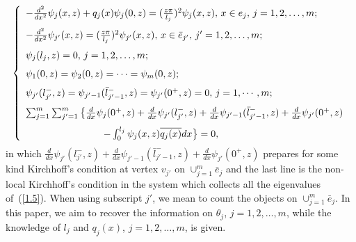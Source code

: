 \documentclass[10pt,a4paper]{article}
\theoremstyle{plain}
\theoremstyle{definition}
\theoremstyle{remark}
\numberwithin{equation}{section}
\begin{document}
\begin{eqnarray}\label{1.5}
\left\{
  \begin{array}{llllll}\vspace{7pt}
-\frac{d^{2}}{dx^{2}}\psi_{j}(x,z)+q_{j}(x)\psi_{j}(0,z)=(\frac{z\pi}{l_{j}})^{2}\psi_{j}(x,z),\,x\in e_{j},\,j=1,2,\ldots,m;\\\vspace{7pt}
-\frac{d^{2}}{dx^{2}}\psi_{j'}(x,z)=(\frac{z\pi}{l_{j}})^{2}\psi_{j'}(x,z),\,x\in \bar{e}_{j'},\,j'=1,2,\ldots,m;\\\vspace{7pt}
\psi_{j}(l_{j},z)=0,\,j=1,2,\ldots,m;\\\vspace{7pt}
\psi_{1}(0,z)=\psi_{2}(0,z)=\cdots=\psi_{m}(0,z);\\\vspace{7pt}
\psi_{j'}(l_{j'}^{-},z)=\psi_{j'-1}(\bar{l}_{j'-1}^{-},z)=\psi_{j'}(0^{+},z)=0,\,j=1,\cdots,m;\\\vspace{7pt}
\sum_{j=1}^{m}\sum_{j'=1}^{m}\big\{\frac{d}{dx}\psi_{j}(0^{+},z)+\frac{d}{dx}\psi_{j'}(l_{j'}^{-},z)+\frac{d}{dx}\psi_{j'-1}(\bar{l}_{j'-1}^{-},z)+\frac{d}{dx}\psi_{j'}(0^{+},z)\\\hspace{80pt}-\int_{0}^{l_{j}}\psi_{j}(x,z)\overline{q_{j}(x)}dx\big\}=0,
  \end{array}
\right.
\end{eqnarray}
in which $\frac{d}{dx}\psi_{j'}(l_{j'}^{-},z)+\frac{d}{dx}\psi_{j'-1}(\bar{l}_{j'-1}^{-},z)+\frac{d}{dx}\psi_{j'}(0^{+},z)$ prepares for some kind Kirchhoff's condition at vertex $v_{j'}$ on $\cup_{j=1}^{m}\bar{e}_{j}$ and the last line is the non-local Kirchhoff's condition in the system which collects all the eigenvalues of~(\ref{1.5}). When using subscript $j'$, we mean to count the objects on $\cup_{j=1}^{m}\bar{e}_{j}$.
In this paper, we aim to recover the information on $\theta_{j}$, $j=1,2,\ldots,m$, while the knowledge of $l_{j}$ and $q_{j}(x)$, $j=1,2,\ldots,m$, is given.
\end{document}
